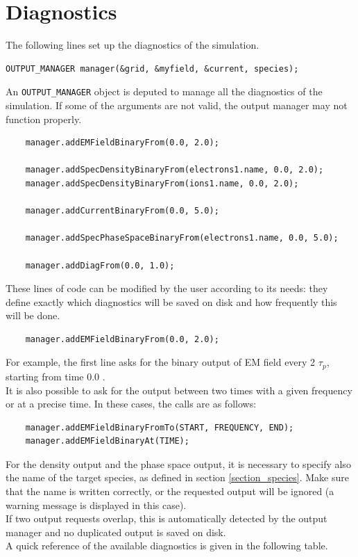 \documentclass[11pt,a4paper]{report}
\begin{document}
\section{Diagnostics}
The following lines set up the diagnostics of the simulation.
\begin{lstlisting}[backgroundcolor=\color{no_modify}]
	OUTPUT_MANAGER manager(&grid, &myfield, &current, species);
\end{lstlisting}
An \verb+OUTPUT_MANAGER+ object is deputed to manage all the diagnostics of the simulation. If some of the arguments are not valid, the output manager may not function properly.
\begin{lstlisting}
	manager.addEMFieldBinaryFrom(0.0, 2.0);

	manager.addSpecDensityBinaryFrom(electrons1.name, 0.0, 2.0);
	manager.addSpecDensityBinaryFrom(ions1.name, 0.0, 2.0);

	manager.addCurrentBinaryFrom(0.0, 5.0);

	manager.addSpecPhaseSpaceBinaryFrom(electrons1.name, 0.0, 5.0);

	manager.addDiagFrom(0.0, 1.0);
\end{lstlisting}
These lines of code can be modified by the user according to its needs: they define exactly which diagnostics will be saved on disk and how frequently this will be done.
\begin{lstlisting}
	manager.addEMFieldBinaryFrom(0.0, 2.0);
\end{lstlisting}
For example, the first line asks for the binary output of EM field every 2 $\tau_p$, starting from time 0.0 . \\
It is also possible to ask for the output between two times with a given frequency or at a precise time. In these cases, the calls are as follows:
\begin{lstlisting}
	manager.addEMFieldBinaryFromTo(START, FREQUENCY, END);
	manager.addEMFieldBinaryAt(TIME);
\end{lstlisting}
For the density output and the phase space output, it is necessary to specify also the name of the target species, as defined in section \ref{section_species}. Make sure that the name is written correctly, or the requested output will be ignored (a warning message is displayed in this case).\\
If two output requests overlap, this is automatically detected by the output manager and no duplicated output is saved on disk. \\
A quick reference of the available diagnostics is given in the following table.
\end{document}
